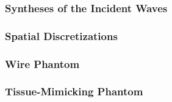 \subsubsection{Syntheses of the Incident Waves}
\label{subsubsec:sim_study_params_inc_waves}


\subsubsection{Spatial Discretizations}
\label{subsubsec:sim_study_params_disc_space}


\subsubsection{Wire Phantom}
\label{subsubsec:sim_study_params_obj_A}


\subsubsection{Tissue-Mimicking Phantom}
\label{subsubsec:sim_study_params_obj_B}


